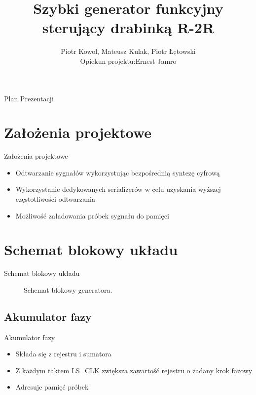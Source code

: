 \documentclass{beamer}
\title{Szybki generator funkcyjny sterujący drabinką R-2R}
\author{Piotr Kowol, Mateusz Kulak, Piotr Łętowski\\ \footnotesize Opiekun projektu:Ernest Jamro}
\institute{Akademia Górniczo-Hutnicza w Krakowie}
\date[\today]
\begin{document}
    \maketitle

    \begin{frame}{Plan Prezentacji}
        \tableofcontents
    \end{frame}

    \section{Założenia projektowe}
    \begin{frame}{Założenia projektowe}
        \begin{block}{}
            \begin{itemize}
                \item Odtwarzanie sygnałów wykorzystując bezpośrednią syntezę cyfrową
                \item Wykorzystanie dedykowanych serializerów w celu uzyskania wyższej częstotliwości odtwarzania
                \item Możliwość załadowania próbek sygnału do pamięci
            \end{itemize}
        \end{block}
    \end{frame}

    \section{Schemat blokowy układu}
    \begin{frame}{Schemat blokowy układu}
        \begin{figure}
            \centering
            \scalebox{0.5}{}
            \caption{Schemat blokowy generatora.}
            \label{sch:DDS}
        \end{figure}
    \end{frame}

    \subsection{Akumulator fazy}
    \begin{frame}{Akumulator fazy}
        \begin{block}{}
            \begin{itemize}
                \item Składa się z rejestru i sumatora
                \item Z każdym taktem LS\_CLK zwiększa zawartość rejestru o zadany krok fazowy
                \item Adresuje pamięć próbek
            \end{itemize}
        \end{block}
    \end{frame}
\end{document}

